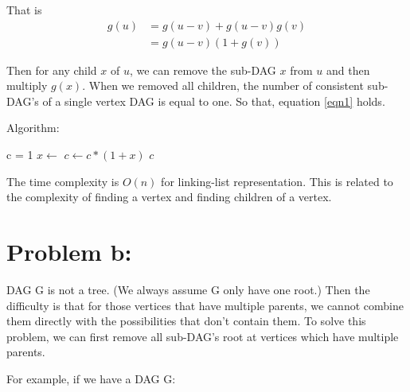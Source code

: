 \documentclass[11pt]{article}
\begin{document}
	That is
	\begin{align*}
		g(u) &= g(u-v) + g(u-v)g(v)\\
		 &= g(u-v)(1+g(v))
	\end{align*}

	Then for any child $x$ of $u$, we can remove the sub-DAG $x$ from $u$ and then multiply $g(x)$. When we removed all children, the number of consistent sub-DAG's of a single vertex DAG is equal to one. So that, equation \ref{eqn1} holds.

	\bigskip
	Algorithm:
	\begin{algorithmic}
				\State {}
			\EndIf
			\State c = 1
				\State $x \gets $ 
				\State $c \gets c * (1 + x)$
			\EndFor
			\State \Return $c$
		\EndFunction
	\end{algorithmic}
	
	The time complexity is $O(n)$ for linking-list representation. This is related to the complexity of finding a vertex and finding children of a vertex.
	
	\section*{Problem b:}
	DAG G is not a tree. (We always assume G only have one root.) Then the difficulty is that for those vertices that have multiple parents, we cannot combine them directly with the possibilities that don't contain them. To solve this problem, we can first remove all sub-DAG's root at vertices which have multiple parents.
	
	\bigskip
	For example, if we have a DAG G:
	
	
	
\end{document}
